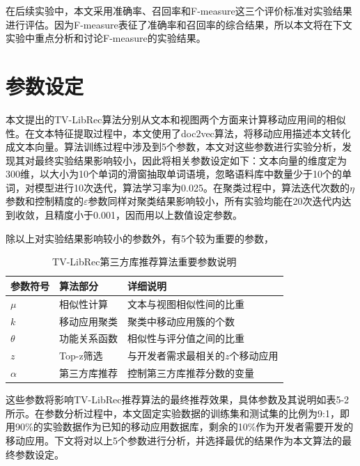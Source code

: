在后续实验中，本文采用准确率、召回率和F-measure这三个评价标准对实验结果进行评估。因为F-measure表征了准确率和召回率的综合结果，所以本文将在下文实验中重点分析和讨论F-measure的实验结果。



\section{参数设定}
本文提出的TV-LibRec算法分别从文本和视图两个方面来计算移动应用间的相似性。在文本特征提取过程中，本文使用了doc2vec算法，将移动应用描述本文转化成文本向量。算法训练过程中涉及到5个参数，本文对这些参数进行实验分析，发现其对最终实验结果影响较小，因此将相关参数设定如下：文本向量的维度定为300维，以大小为10个单词的滑窗抽取单词语境，忽略语料库中数量少于10个的单词，对模型进行10次迭代，算法学习率为0.025。在聚类过程中，算法迭代次数的$\eta$参数和控制精度的$\varepsilon$参数同样对聚类结果影响较小，所有实验均能在20次迭代内达到收敛，且精度小于0.001，因而用以上数值设定参数。

除以上对实验结果影响较小的参数外，有5个较为重要的参数，
\begin{table}
\centering
\caption{TV-LibRec第三方库推荐算法重要参数说明}
\begin{tabular}{C{1in}C{1.2in}C{3.2in}}
\hline\hline
参数符号 & 算法部分 & 详细说明 \\
\hline\hline
$\mu$ & 相似性计算 & 文本与视图相似性间的比重 \\
$k$ & 移动应用聚类 & 聚类中移动应用簇的个数 \\
$\theta$ & 功能关系函数 & 相似性与评分值之间的比重 \\
$z$ & Top-z筛选 & 与开发者需求最相关的$z$个移动应用 \\
$\alpha$ & 第三方库推荐 & 控制第三方库推荐分数的变量 \\ 
\hline\hline
\end{tabular}
\end{table}
这些参数将影响TV-LibRec推荐算法的最终推荐效果，具体参数及其说明如表5-2所示。在参数分析过程中，本文固定实验数据的训练集和测试集的比例为9:1，即用90\%的实验数据作为已知的移动应用数据库，剩余的10\%作为开发者需要开发的移动应用。下文将对以上5个参数进行分析，并选择最优的结果作为本文算法的最终参数设定。

